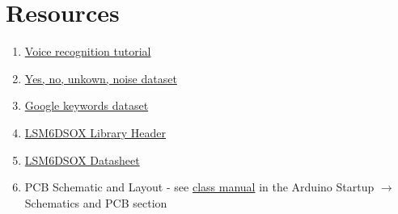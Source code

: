 \section{Resources}\label{sec:machinelearningresources}
\begin{enumerate}
    \item \href{https://pietropoluzzi.it/blog/ml/edge-impulse/voice-recognition/}{Voice recognition tutorial}
    \item \href{https://docs.edgeimpulse.com/docs/pre-built-datasets/keyword-spotting}{Yes, no, unkown, noise dataset}
    \item \href{https://blog.research.google/2017/08/launching-speech-commands-dataset.html}{Google keywords dataset}
    \item \href{https://github.com/stm32duino/LSM6DSOX/blob/main/src/LSM6DSOXSensor.h}{LSM6DSOX Library Header}
    \item \href{https://www.st.com/resource/en/datasheet/lsm6dsox.pdf}{LSM6DSOX Datasheet}
    \item PCB Schematic and Layout - see 
            \href{https://github.com/semcneil/Fundamentals-of-Microcontrollers-Manual}{class manual} 
            in the Arduino Startup $\rightarrow$ Schematics and PCB section
\end{enumerate}

